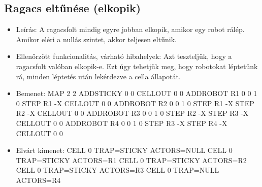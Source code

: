 \subsection{Ragacs eltűnése (elkopik)}
\begin{itemize}
	\item Leírás: \newline
	A ragacsfolt mindig egyre jobban elkopik, amikor egy robot rálép. Amikor eléri a nullás szintet, akkor teljesen eltűnik.
	\item Ellenőrzött funkcionalitás, várható hibahelyek: \newline 
	Azt teszteljük, hogy a ragacsfolt valóban elkopik-e. Ezt úgy tehetjük meg, hogy robotokat léptetünk rá, minden léptetés után lekérdezve a cella állapotát.
	\item Bemenet: \newline
	MAP 2 2
		ADDSTICKY 0 0 \newline
		CELLOUT 0 0 \newline
		ADDROBOT R1 0 0 1 0 \newline
		STEP R1 -X \newline
		CELLOUT 0 0 \newline
		ADDROBOT R2 0 0 1 0 \newline
		STEP R1 -X \newline
		STEP R2 -X \newline
		CELLOUT 0 0 \newline
		ADDROBOT R3 0 0 1 0 \newline
		STEP R2 -X \newline
		STEP R3 -X \newline
		CELLOUT 0 0 \newline
		ADDROBOT R4 0 0 1 0 \newline
		STEP R3 -X \newline
		STEP R4 -X \newline
		CELLOUT 0 0 \newline
	\item Elvárt kimenet: \newline
	CELL 0 TRAP=STICKY ACTORS=NULL
	\newline
	CELL 0 TRAP=STICKY ACTORS=R1
	\newline
	CELL 0 TRAP=STICKY ACTORS=R2
	\newline
	CELL 0 TRAP=STICKY ACTORS=R3
	\newline
	CELL 0 TRAP=NULL ACTORS=R4
	
\end{itemize}

